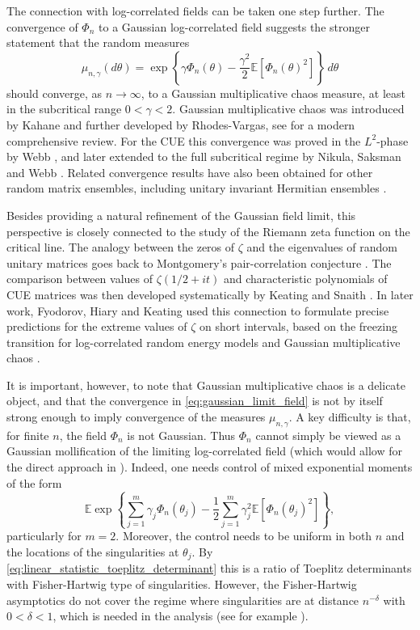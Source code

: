 \documentclass[11pt]{amsart}
\theoremstyle{plain}
\theoremstyle{remark}
\numberwithin{equation}{section}
\begin{document}
The connection with log-correlated fields can be taken one step further.
%
%
%
%
The convergence of $\Phi_n$ to a
Gaussian log-correlated field suggests the stronger statement that the random
measures
\begin{equation}\label{eq:gmc_measure_char_poly}
\mu_{n,\gamma}(d\theta)
=
\exp\left\{
\gamma \Phi_n(\theta)
-
\frac{\gamma^2}{2}\mathbb E\left[\Phi_n(\theta)^2\right]
\right\}\,d\theta
\end{equation}
should converge, as $n\to\infty$, to a Gaussian multiplicative chaos measure,
at least in the subcritical range $0<\gamma<2$. Gaussian multiplicative chaos was introduced by Kahane \cite{Kahane} and further developed by Rhodes-Vargas,  see \cite{RV} for a modern comprehensive review.  For the CUE this convergence was proved in the $L^2$-phase by Webb \cite{W}, and later extended to the full subcritical regime by Nikula, Saksman and Webb \cite{NSW}. Related convergence results have also been obtained for other random matrix ensembles, including unitary invariant Hermitian ensembles \cite{BWW}.

Besides providing a natural refinement of the Gaussian field limit, this
perspective is closely connected to the study of the Riemann zeta function on
the critical line. The analogy between the zeros of $\zeta$ and the eigenvalues
of random unitary matrices goes back to Montgomery's pair-correlation
conjecture \cite{M}. The comparison between values of $\zeta(1/2+it)$ and
characteristic polynomials of CUE matrices was then developed systematically by
Keating and Snaith \cite{KS}. In later work, Fyodorov, Hiary and Keating used this connection to formulate
precise predictions for the extreme values of $\zeta$ on short intervals, based
on the freezing transition for log-correlated random energy models and Gaussian
multiplicative chaos \cite{FHK,FK}.



It is important, however, to note that Gaussian multiplicative chaos is a
delicate object, and that the convergence in \eqref{eq:gaussian_limit_field} is
not by itself strong enough to imply convergence of the measures
$\mu_{n,\gamma}$. A key difficulty is that, for finite $n$, the field $\Phi_n$
is not Gaussian. Thus $\Phi_n$ cannot simply be viewed as a Gaussian
mollification of the limiting log-correlated field (which would allow for the direct approach in \cite{Ber}). Indeed, one needs control of mixed
exponential moments of the form
\begin{equation}\label{eq:mixed_exponential_moment}
\mathbb E\exp\left\{
\sum_{j=1}^m \gamma_j \Phi_n(\theta_j)
-
\frac12
\sum_{j=1}^m \gamma_j^2
\mathbb E\left[\Phi_n(\theta_j)^2\right]
\right\},
\end{equation}
particularly for $m=2$. Moreover, the control needs to be uniform in both $n$ and the locations of the singularities at $\theta_j$. By \eqref{eq:linear_statistic_toeplitz_determinant} this is a ratio of Toeplitz determinants with Fisher-Hartwig type of singularities. However, the Fisher-Hartwig asymptotics do not cover the regime where singularities are at distance $n^{-\delta}$ with $0<\delta<1$, which is needed in the analysis (see for example \cite{CFLW}).
\end{document}
